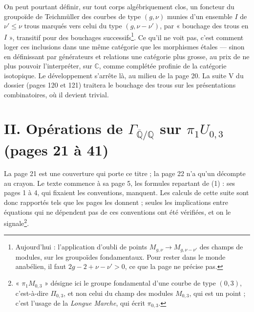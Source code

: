 \documentclass[11pt,a4paper]{article}
\begin{document}
On peut pourtant définir, sur tout corps algébriquement clos, un foncteur du
groupoïde de Teichmüller des courbes de type $(g, \nu)$ munies d'un ensemble
$I$ de $\nu' \leq \nu$ trous marqués vers celui du type $(g, \nu - \nu')$, par
« bouchage des trous en $I$ », transitif pour des bouchages
successifs\footnote{Aujourd'hui : l'application d'oubli de points
$M_{g,\nu} \to M_{g,\nu-\nu'}$ des champs de modules, sur les groupoïdes
fondamentaux. Pour rester dans le monde anabélien, il faut $2g - 2 + \nu -
\nu' > 0$, ce que la page ne précise pas.}. Ce qu'il ne voit pas, c'est
comment loger ces inclusions dans une même catégorie que les morphismes
étales — sinon en définissant par générateurs et relations une catégorie plus
grosse, au prix de ne plus pouvoir l'interpréter, sur $\mathbb{C}$, comme
complétée profinie de la catégorie isotopique. Le développement s'arrête là,
au milieu de la page 20. La suite V du dossier (pages 120 et 121) traitera le
bouchage des trous sur les présentations combinatoires, où il devient trivial.

\section*{II. Opérations de $\Gamma_{\overline{\mathbb{Q}}/\mathbb{Q}}$ sur $\pi_1 U_{0,3}$ (pages 21 à 41)}

La page 21 est une couverture qui porte ce titre ; la page 22 n'a qu'un
décompte au crayon. Le texte commence à sa page 5, les formules repartant de
(1) : ses pages 1 à 4, qui fixaient les conventions, manquent. Les calculs de
cette suite sont donc rapportés tels que les pages les donnent ; seules les
implications entre équations qui ne dépendent pas de ces conventions ont été
vérifiées, et on le signale\footnote{« $\pi_1 M_{0,3}$ » désigne ici le groupe
fondamental d'une courbe de type $(0, 3)$, c'est-à-dire $\Pi_{0,3}$, et non
celui du champ des modules $M_{0,3}$, qui est un point ; c'est l'usage de la
\emph{Longue Marche}, qui écrit $\pi_{0,3}$.}.
\end{document}

